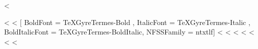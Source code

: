 <%
\usepackage[no-math]{fontspec}
  <%
\setmainfont{Arial}
  <%
\setmainfont{TeXGyreTermes-Regular}[
      BoldFont       = TeXGyreTermes-Bold ,
      ItalicFont     = TeXGyreTermes-Italic ,
      BoldItalicFont = TeXGyreTermes-BoldItalic,
      NFSSFamily     = ntxtlf]
\setsansfont[Scale=.9]{TeX Gyre Heros Regular}
\setmonofont[StylisticSet={1,3},Scale=.9]{inconsolata}
\RequirePackage{newtxmath}
  <%
  <%
<%
  <%
  <%
\RequirePackage{newtxtext}
\RequirePackage{newtxmath}
\RequirePackage[varl,scaled=.9]{inconsolata}
  <%
<%
